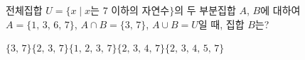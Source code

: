 전체집합 $U=\{x \mid x$는 $7$ 이하의 자연수$\}$의 두 부분집합 $A$, $B$에 대하여 $A=\{1,\,3,\,6,\,7\}$, $A\cap B=\{3,\,7\}$, $A\cup B=U$일 때, 집합 $B$는?
\begin{choices32}{$\{3,\,7\}$}{$\{2,\,3,\,7\}$}{$\{1,\,2,\,3,\,7\}$}{$\{2,\,3,\,4,\,7\}$}{$\{2,\,3,\,4,\,5,\,7\}$}\end{choices32}
